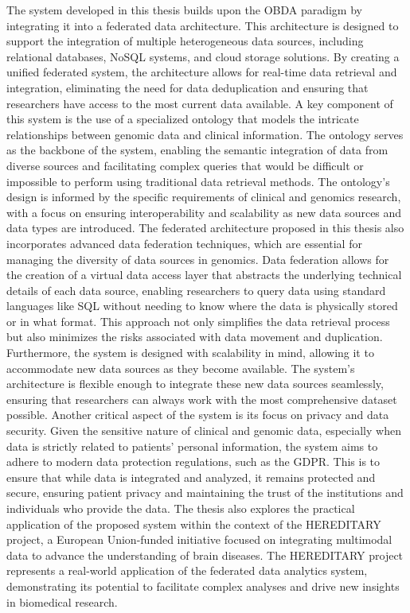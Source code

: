 The system developed in this thesis builds upon the \ac{OBDA} paradigm by integrating it into a federated data architecture. This architecture is designed to support the integration of multiple heterogeneous data sources, including relational databases, NoSQL systems, and cloud storage solutions. By creating a unified federated system, the architecture allows for real-time data retrieval and integration, eliminating the need for data deduplication and ensuring that researchers have access to the most current data available.
A key component of this system is the use of a specialized ontology that models the intricate relationships between genomic data and clinical information. The ontology serves as the backbone of the system, enabling the semantic integration of data from diverse sources and facilitating complex queries that would be difficult or impossible to perform using traditional data retrieval methods. The ontology's design is informed by the specific requirements of clinical and genomics research, with a focus on ensuring interoperability and scalability as new data sources and data types are introduced.
The federated architecture proposed in this thesis also incorporates advanced data federation techniques, which are essential for managing the diversity of data sources in genomics. Data federation allows for the creation of a virtual data access layer that abstracts the underlying technical details of each data source, enabling researchers to query data using standard languages like \ac{SQL} without needing to know where the data is physically stored or in what format. This approach not only simplifies the data retrieval process but also minimizes the risks associated with data movement and duplication.
Furthermore, the system is designed with scalability in mind, allowing it to accommodate new data sources as they become available. The system's architecture is flexible enough to integrate these new data sources seamlessly, ensuring that researchers can always work with the most comprehensive dataset possible.
Another critical aspect of the system is its focus on privacy and data security. Given the sensitive nature of clinical and genomic data, especially when data is strictly related to patients’ personal information, the system aims to adhere to modern data protection regulations, such as the \ac{GDPR}. This is to ensure that while data is integrated and analyzed, it remains protected and secure, ensuring patient privacy and maintaining the trust of the institutions and individuals who provide the data.
The thesis also explores the practical application of the proposed system within the context of the \ac{HEREDITARY} project, a European Union-funded initiative focused on integrating multimodal data to advance the understanding of brain diseases. The \ac{HEREDITARY} project represents a real-world application of the federated data analytics system, demonstrating its potential to facilitate complex analyses and drive new insights in biomedical research.
